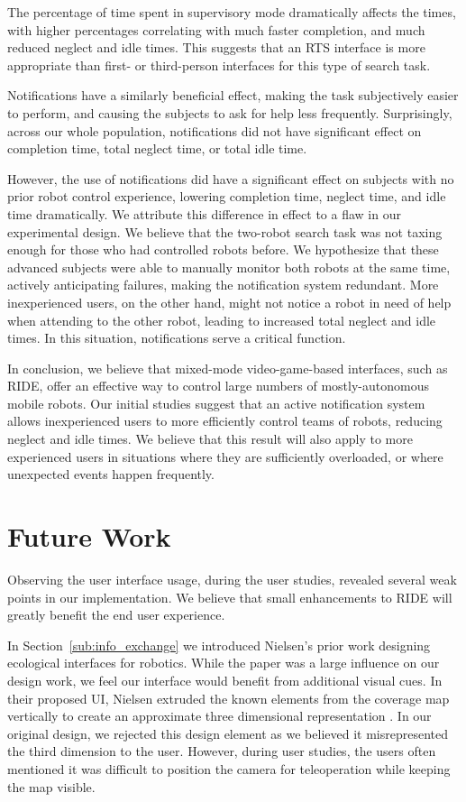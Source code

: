 The percentage of time spent in supervisory mode dramatically affects the times, with higher percentages correlating with much faster completion, and much reduced neglect and idle times. This suggests that an RTS interface is more appropriate than first- or third-person interfaces for this type of search task.

Notifications have a similarly beneficial effect, making the task subjectively easier to perform, and causing the subjects to ask for help less frequently. Surprisingly, across our whole population, notifications did not have significant effect on completion time, total neglect time, or total idle time.

However, the use of notifications did have a significant effect on subjects with no prior robot control experience, lowering completion time, neglect time, and idle time dramatically. We attribute this difference in effect to a flaw in our experimental design. We believe that the two-robot search task was not taxing enough for those who had controlled robots before. We hypothesize that these advanced subjects were able to manually monitor both robots at the same time, actively anticipating failures, making the notification system redundant. More inexperienced users, on the other hand, might not notice a robot in need of help when attending to the other robot, leading to increased total neglect and idle times. In this situation, notifications serve a critical function.

In conclusion, we believe that mixed-mode video-game-based interfaces, such as RIDE, offer an effective way to control large numbers of mostly-autonomous mobile robots. Our initial studies suggest that an active notification system allows inexperienced users to more efficiently control teams of robots, reducing neglect and idle times. We believe that this result will also apply to more experienced users in situations where they are sufficiently overloaded, or where unexpected events happen frequently.


\section{Future Work}
\label{section:futurework}
Observing the user interface usage, during the user studies, revealed several weak points in our implementation. We believe that small enhancements to RIDE will greatly benefit the end user experience.

In Section~\ref{sub:info_exchange} we introduced Nielsen's prior work designing ecological interfaces for robotics. While the paper was a large influence on our design work, we feel our interface would benefit from additional visual cues. In their proposed UI, Nielsen extruded the known elements from the coverage map vertically to create an approximate three dimensional representation \cite{Nielsen_Teleoperation}. In our original design, we rejected this design element as we believed it misrepresented the third dimension to the user. However, during user studies, the users often mentioned it was difficult to position the camera for teleoperation while keeping the map visible.

